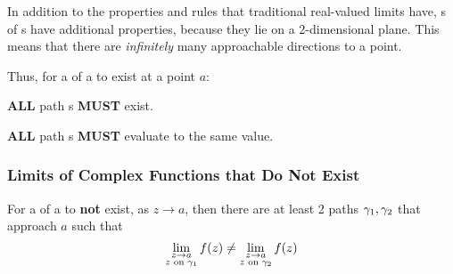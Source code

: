 In addition to the properties and rules that traditional real-valued limits have, s of s have additional properties, because they lie on a 2-dimensional plane.
This means that there are \textit{infinitely} many approachable directions to a point.

Thus, for a  of a  to exist at a point $a$:
\begin{propertylist}
\item \textbf{ALL} path s \textbf{MUST} exist.
\item \textbf{ALL} path s \textbf{MUST} evaluate to the same value.
\end{propertylist}

\subsubsection{Limits of Complex Functions that Do Not Exist}\label{subsubsec:Complex_Limit_DNE}
For a  of a  to \textbf{not} exist, as $z \to a$, then there are at least 2 paths $\gamma_{1}, \gamma_{2}$ that approach $a$ such that
\begin{equation}\label{eq:Complex_Limit_DNE}
  \lim\limits_{\substack{z \to a \\ z \text{ on } \gamma_{1}}} f(z) \neq \lim\limits_{\substack{z \to a \\ z \text{ on } \gamma_{2}}} f(z)
\end{equation}

